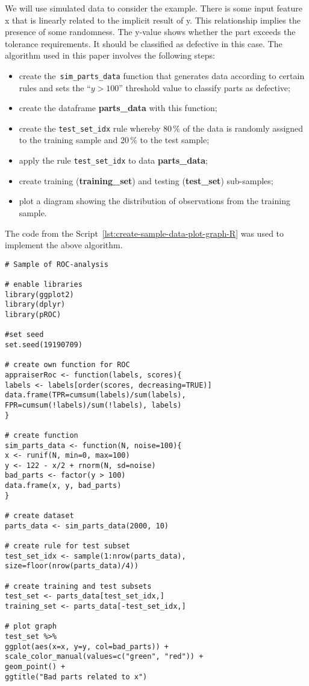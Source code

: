 \documentclass[]{scrreprt}
\begin{document}
We will use simulated data to consider the example. There is some input feature x that is linearly related to the implicit result of y. This relationship implies the presence of some randomness. The y-value shows whether the part exceeds the tolerance requirements. It should be classified as defective in this case. The algorithm used in this paper involves the following steps:
\begin{itemize}
	\item create the~\texttt{sim\_parts\_data} function that generates data according to certain rules and sets the ``$y>100$'' threshold value to classify parts as defective;
	\item create the dataframe \textbf{parts\_data} with this function;
	\item create the \texttt{test\_set\_idx} rule whereby 80\,\% of the data is randomly assigned to the training sample and 20\,\% to the test sample;
	\item apply the rule \texttt{test\_set\_idx} to data \textbf{parts\_data};
	\item create training (\textbf{training\_set}) and testing (\textbf{test\_set}) sub-samples;
	\item plot a diagram showing the distribution of observations from the training sample.
\end{itemize}
The code from the Script~\ref{lst:create-sample-data-plot-graph-R} was used to implement the above algorithm.
%
\begin{lstlisting}[float=htp, caption = Creation and primary visualization of~data on~quality and defective parts, firstnumber=1, label= lst:create-sample-data-plot-graph-R]
# Sample of ROC-analysis

# enable libraries
library(ggplot2)
library(dplyr)
library(pROC)

#set seed
set.seed(19190709)

# create own function for ROC
appraiserRoc <- function(labels, scores){
labels <- labels[order(scores, decreasing=TRUE)]
data.frame(TPR=cumsum(labels)/sum(labels),
FPR=cumsum(!labels)/sum(!labels), labels)
}

# create function 
sim_parts_data <- function(N, noise=100){
x <- runif(N, min=0, max=100)
y <- 122 - x/2 + rnorm(N, sd=noise)
bad_parts <- factor(y > 100)
data.frame(x, y, bad_parts)
}

# create dataset
parts_data <- sim_parts_data(2000, 10)

# create rule for test subset
test_set_idx <- sample(1:nrow(parts_data), size=floor(nrow(parts_data)/4))

# create training and test subsets
test_set <- parts_data[test_set_idx,]
training_set <- parts_data[-test_set_idx,]

# plot graph
test_set %>% 
ggplot(aes(x=x, y=y, col=bad_parts)) + 
scale_color_manual(values=c("green", "red")) + 
geom_point() + 
ggtitle("Bad parts related to x")

\end{lstlisting}
%
\end{document}
